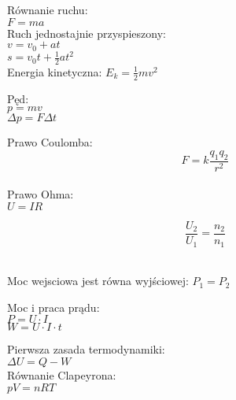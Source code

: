 \documentclass[a4paper,10pt]{article}
\begin{document}
\pagestyle{empty} %

\begin{multicols}{2}

\begin{tcolorbox}[title=\textbf{Mechanika}, colframe=pastelblue, colback=white]
Równanie ruchu: \\
$F = ma$\\[6pt]
Ruch jednostajnie przyspieszony: \\
$v = v_0 + at$\\
$s = v_0t + \frac{1}{2}at^2$\\[6pt]
Energia kinetyczna: $E_k = \frac{1}{2}mv^2$

Pęd:\\
$p = m v$\\
$\Delta p = F \Delta t$
\end{tcolorbox}



\begin{tcolorbox}[title=\textbf{Elektryczność}, colframe=pastelpink, colback=white]
Prawo Coulomba: \\
$$F = k \frac{q_1 q_2}{r^2}$$\\[6pt]
Prawo Ohma: \\
$U = IR$ \\
\begin{multicols}{2}
  \centering
  
  \columnbreak
  
  \centering
  $$\frac{U_2}{U_1} = \frac{n_2}{n_1}$$\\ \vspace{0.15cm}
  
  Moc wejsciowa jest równa wyjściowej: $P_1 = P_2$
\end{multicols}

Moc i praca prądu:\\
$P = U\cdot I$\\ 
$W = U\cdot I\cdot t$


\end{tcolorbox}

\begin{tcolorbox}[title=\textbf{Termodynamika}, colframe=pastelgreen, colback=white]
Pierwsza zasada termodynamiki: \\
$\Delta U = Q - W$\\[6pt]
Równanie Clapeyrona: \\
$pV = nRT$
\end{tcolorbox}


\end{multicols}
\end{document}
